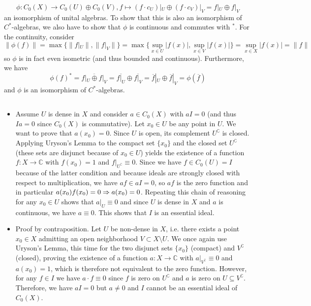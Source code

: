 \documentclass[a4paper]{article}
\begin{document}
\begin{itemize}
    \begin{equation*}
        \phi: C_0(X) \to C_0(U) \oplus C_0(V), f \mapsto (f \cdot c_U)|_U \oplus (f \cdot c_V)|_V = f|_U \oplus f|_V
    \end{equation*}
    an isomorphism of unital algebras. To show that this is also an isomorphism of $C^*$-algebras, we also have to show that $\phi$ is continuous and commutes with $^*$. For the continuity, consider
    \begin{equation*}
        \| \phi(f) \| = \max\{ \| f|_U \|, \| f|_V \| \} = \max \{ \sup_{x \in U} | f(x) |, \sup_{x \in V} | f(x) | \} = \sup_{x \in X} |f(x)| = \|f\|
    \end{equation*}
    so $\phi$ is in fact even isometric (and thus bounded and continuous). Furthermore, we have
    \begin{equation*}
        \phi(f)^* = \overline{f|_U \oplus f|_V} = \overline{f|_U} \oplus \overline{f|_V} = \overline{f}|_U \oplus \overline{f}|_V =  \phi(\overline{f})
    \end{equation*}
    and $\phi$ is an isomorphism of $C^*$-algebras.
\end{itemize}



\addtocounter{subsection}{1}
\subsection{}

\begin{itemize}
    \item Assume $U$ is dense in $X$ and consider $a \in C_0(X)$ with $aI = 0$ (and thus $Ia = 0$ since $C_0(X)$ is commutative). Let $x_0 \in U$ be any point in $U$. We want to prove that $a(x_0) = 0$. Since $U$ is open, its complement $U^\complement$ is closed. Applying Uryson's Lemma to the compact set $\{x_0\}$ and the closed set $U^\complement$ (these sets are disjunct because of $x_0 \in U$) yields the existence of a function $f: X \to \mathds{C}$ with $f(x_0) = 1$ and $f|_{U^\complement} \equiv 0$. Since we have $f \in C_0(U) = I$ because of the latter condition and because ideals are strongly closed with respect to multiplication, we have $a f \in aI = 0$, so $a f$ is the zero function and in particular $a(x_0) f(x_0) = 0 \Rightarrow a(x_0) = 0$. Repeating this chain of reasoning for any $x_0 \in U$ shows that $a|_U \equiv 0$ and since $U$ is dense in $X$ and $a$ is continuous, we have $a \equiv 0$. This shows that $I$ is an essential ideal.
    \item Proof by contraposition. Let $U$ be non-dense in $X$, i.e. there exists a point $x_0 \in X$ admitting an open neighborhood $V \subset X \setminus U$. We once again use Uryson's Lemma, this time for the two disjunct sets $\{x_0\}$ (compact) and $V^\complement$ (closed), proving the existence of a function $a: X \to \mathds{C}$ with $a|_{V^\complement} \equiv 0$ and $a(x_0) = 1$, which is therefore not equivalent to the zero function. However, for any $f \in I$ we have $a \cdot f \equiv 0$ since $f$ is zero on $U^\complement$ and $a$ is zero on $U \subseteq V^\complement$. Therefore, we have $aI = 0$ but $a \neq 0$ and $I$ cannot be an essential ideal of $C_0(X)$.
\end{itemize}

\subsection{}
\end{document}
